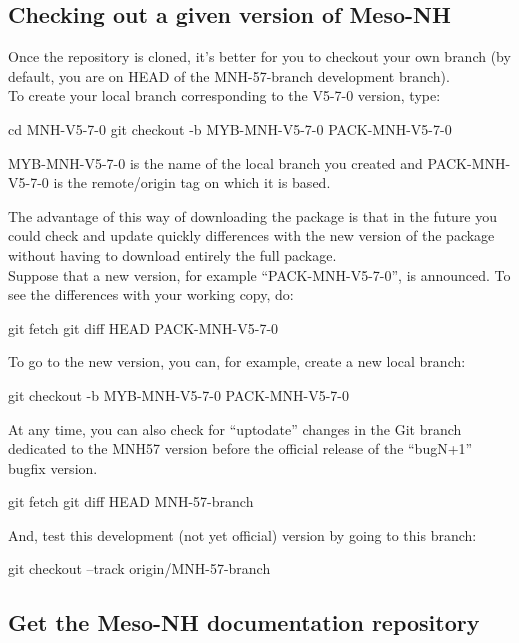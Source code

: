 \subsection{Checking out a given version of Meso-NH}

Once the repository is cloned, it's better for you to checkout your own branch (by default, you are on HEAD of the MNH-57-branch development branch). \\

To create your local branch corresponding to the V5-7-0 version, type:
\begin{bashcode}
cd MNH-V5-7-0
git checkout -b MYB-MNH-V5-7-0 PACK-MNH-V5-7-0
\end{bashcode}

MYB-MNH-V5-7-0 is the name of the local branch you created and PACK-MNH-V5-7-0 is the remote/origin tag on which it is based.

The advantage of this way of downloading the package is that in the future you could check and update quickly differences with the new version of the package without having to download entirely the full package. \\

Suppose that a new version, for example ``PACK-MNH-V5-7-0'', is announced. To see the differences with your working copy, do:
\begin{bashcode}
git fetch
git diff HEAD PACK-MNH-V5-7-0
\end{bashcode}

To go to the new version, you can, for example, create a new local branch:
\begin{bashcode}
git checkout -b MYB-MNH-V5-7-0 PACK-MNH-V5-7-0
\end{bashcode}

At any time, you can also check for ``uptodate'' changes in the Git branch dedicated to the MNH57 version before the official release of the ``bugN+1'' bugfix version.
\begin{bashcode}
git fetch
git diff HEAD MNH-57-branch
\end{bashcode}

And, test this development (not yet official) version by going to this branch:
\begin{bashcode}
git checkout --track origin/MNH-57-branch
\end{bashcode}

\subsection{Get the Meso-NH documentation repository}

